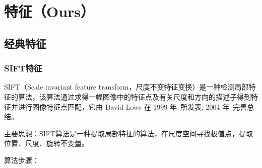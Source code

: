 \documentclass[12pt]{article}
\begin{document}
\section{特征（Ours）}

\subsection{经典特征}

\subsubsection{SIFT特征}

SIFT（Scale invariant feature transform，尺度不变特征变换）是一种检测局部特征的算法，该算法通过求得一幅图像中的特征点及有关尺度和方向的描述子得到特征并进行图像特征点匹配，它由 David Lowe 在 1999 年~\cite{lowe1999object}所发表, 2004 年~\cite{lowe2004distinctive}完善总结。%

{\color{blue}主要思想}：SIFT算法是一种提取局部特征的算法，在尺度空间寻找极值点，提取位置、尺度、旋转不变量。

{\color{blue}算法步骤}：
\end{document}
